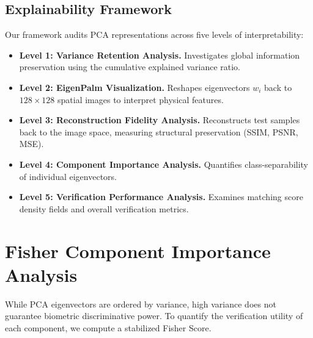 \documentclass[conference]{IEEEtran}
\begin{document}
\subsection{Explainability Framework}
Our framework audits PCA representations across five levels of interpretability:
\begin{itemize}
    \item \textbf{Level 1: Variance Retention Analysis.} Investigates global information preservation using the cumulative explained variance ratio.
    \item \textbf{Level 2: EigenPalm Visualization.} Reshapes eigenvectors $w_i$ back to $128 \times 128$ spatial images to interpret physical features.
    \item \textbf{Level 3: Reconstruction Fidelity Analysis.} Reconstructs test samples back to the image space, measuring structural preservation (SSIM, PSNR, MSE).
    \item \textbf{Level 4: Component Importance Analysis.} Quantifies class-separability of individual eigenvectors.
    \item \textbf{Level 5: Verification Performance Analysis.} Examines matching score density fields and overall verification metrics.
\end{itemize}

\section{Fisher Component Importance Analysis}
\label{sec:fisher}

While PCA eigenvectors are ordered by variance, high variance does not guarantee biometric discriminative power. To quantify the verification utility of each component, we compute a stabilized Fisher Score. 
\end{document}
